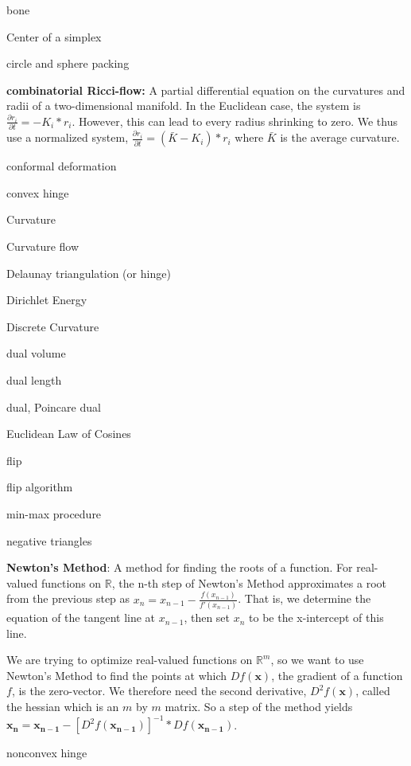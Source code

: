 \documentclass{article}
\begin{document}
bone

Center of a simplex

circle and sphere packing \newline

\textbf{combinatorial Ricci-flow:}
	A partial differential equation on the curvatures and radii of a two-dimensional manifold. In the Euclidean case, the system is $\frac{\partial r_i }{\partial t} = -K_i * r_i$. However, this can lead to every radius shrinking to zero. We thus use a normalized system, $\frac{\partial r_i }{\partial t} = (\bar{K} - K_i) * r_i$ where $\bar{K}$ is the average curvature. \newline

conformal deformation

convex hinge

Curvature

Curvature flow

Delaunay triangulation (or hinge)

Dirichlet Energy

Discrete Curvature

dual volume

dual length

dual, Poincare dual

Euclidean Law of Cosines

flip

flip algorithm

min-max procedure

negative triangles

\textbf{Newton's Method}: A method for finding the roots of a function. For real-valued functions on $\mathbb{R}$, the n-th step of Newton's Method approximates a root from the previous step as $x_n = x_{n-1} - \frac{f(x_{n-1})}{f'(x_{n-1})}$. That is, we determine the equation of the tangent line at $x_{n-1}$, then set $x_n$ to be the x-intercept of this line. \newline

\noindent We are trying to optimize real-valued functions on $\mathbb{R}^m$, so we want to use Newton's Method to find the points at which $Df(\mathbf{x})$, the gradient of a function $f$, is the zero-vector. We therefore need the second derivative, $D^2f(\mathbf{x})$, called the hessian which is an $m$ by $m$ matrix. So a step of the method yields $\mathbf{x_n} = \mathbf{x_{n-1}} - [D^2f(\mathbf{x_{n-1}})]^{-1} * Df(\mathbf{x_{n-1}})$. \newline

nonconvex hinge
\end{document}
